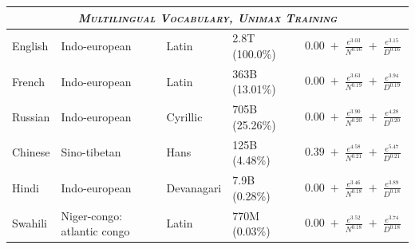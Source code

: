 \begin{table}
\begin{tabular}{l|lll|l}
\midrule
\multicolumn{5}{c}{\textsc{\emph{Multilingual Vocabulary, Unimax Training}}} \\
\midrule

English & Indo-european & Latin & 2.8T (100.0\%) & $\,0.00\;+\;\frac{e^{3.03}}{N^{0.16}}\;+\;\frac{e^{3.15}}{D^{0.16}}\,$ \\[2mm]
French & Indo-european & Latin & 363B (13.01\%) & $\,0.00\;+\;\frac{e^{3.63}}{N^{0.19}}\;+\;\frac{e^{3.94}}{D^{0.19}}\,$ \\[2mm]
Russian & Indo-european & Cyrillic & 705B (25.26\%) & $\,0.00\;+\;\frac{e^{3.90}}{N^{0.20}}\;+\;\frac{e^{4.28}}{D^{0.20}}\,$ \\[2mm]
Chinese & Sino-tibetan & Hans & 125B (4.48\%) & $\,0.39\;+\;\frac{e^{4.58}}{N^{0.21}}\;+\;\frac{e^{5.47}}{D^{0.21}}\,$ \\[2mm]
Hindi & Indo-european & Devanagari & 7.9B (0.28\%) & $\,0.00\;+\;\frac{e^{3.46}}{N^{0.18}}\;+\;\frac{e^{3.89}}{D^{0.18}}\,$ \\[2mm]
Swahili & Niger-congo: atlantic congo & Latin & 770M (0.03\%) & $\,0.00\;+\;\frac{e^{3.52}}{N^{0.18}}\;+\;\frac{e^{3.74}}{D^{0.18}}\,$ \\[2mm]

\bottomrule
\end{tabular}
\label{tab:mono-scaling-laws}
\end{table}